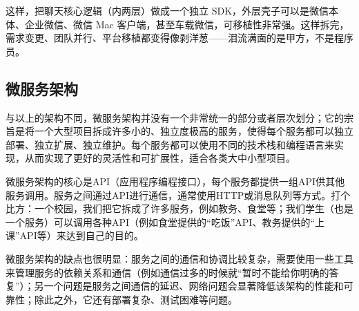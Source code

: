 \documentclass[../main.tex]{subfiles}
\begin{document}
这样，把聊天核心逻辑（内两层）做成一个独立 SDK，外层壳子可以是微信本体、企业微信、微信 Mac 客户端，甚至车载微信，可移植性非常强。这样拆完，需求变更、团队并行、平台移植都变得像剥洋葱——泪流满面的是甲方，不是程序员。

\subsection{微服务架构}

与以上的架构不同，微服务架构并没有一个非常统一的部分或者层次划分；它的宗旨是将一个大型项目拆成许多小的、独立度极高的服务，使得每个服务都可以独立部署、独立扩展、独立维护。每个服务都可以使用不同的技术栈和编程语言来实现，从而实现了更好的灵活性和可扩展性，适合各类大中小型项目。

微服务架构的核心是API（应用程序编程接口），每个服务都提供一组API供其他服务调用。服务之间通过API进行通信，通常使用HTTP或消息队列等方式。打个比方：一个校园，我们把它拆成了许多服务，例如教务、食堂等；我们学生（也是一个服务）可以调用各种API（例如食堂提供的“吃饭”API、教务提供的“上课”API等）来达到自己的目的。

微服务架构的缺点也很明显：服务之间的通信和协调比较复杂，需要使用一些工具来管理服务的依赖关系和通信（例如通信过多的时候就“暂时不能给你明确的答复”）；另一个问题是服务之间通信的延迟、网络问题会显著降低该架构的性能和可靠性；除此之外，它还有部署复杂、测试困难等问题。
\end{document}

